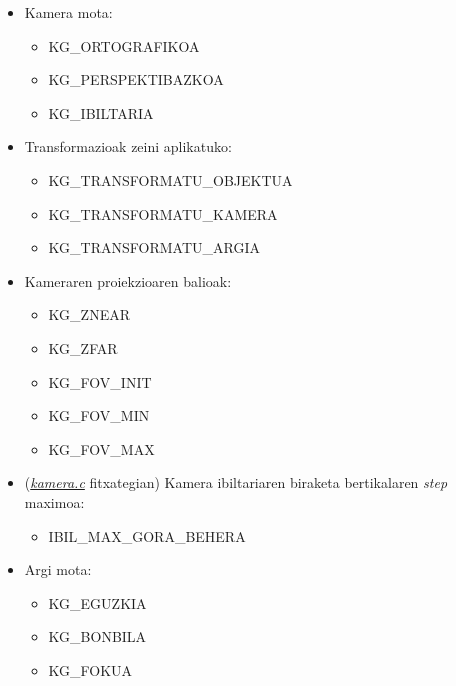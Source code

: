 \documentclass[12pt]{article}
\newcommand{\fitxategi}[1] {\underline{\textit{#1}}}
\begin{document}
\begin{itemize}
\item Kamera mota:
\begin{itemize}
\item KG\_ORTOGRAFIKOA
\item KG\_PERSPEKTIBAZKOA
\item KG\_IBILTARIA
\end{itemize}

\item Transformazioak zeini aplikatuko:
\begin{itemize}
\item KG\_TRANSFORMATU\_OBJEKTUA
\item KG\_TRANSFORMATU\_KAMERA
\item KG\_TRANSFORMATU\_ARGIA
\end{itemize}

\item Kameraren proiekzioaren balioak:
\begin{itemize}
\item KG\_ZNEAR
\item KG\_ZFAR
\item KG\_FOV\_INIT
\item KG\_FOV\_MIN
\item KG\_FOV\_MAX
\end{itemize}

\item (\fitxategi{kamera.c} fitxategian) Kamera ibiltariaren biraketa bertikalaren \textit{step} maximoa:
\begin{itemize}
\item IBIL\_MAX\_GORA\_BEHERA
\end{itemize}

\item Argi mota:
\begin{itemize}
\item KG\_EGUZKIA
\item KG\_BONBILA
\item KG\_FOKUA
\end{itemize}

\end{itemize}



\end{document}
